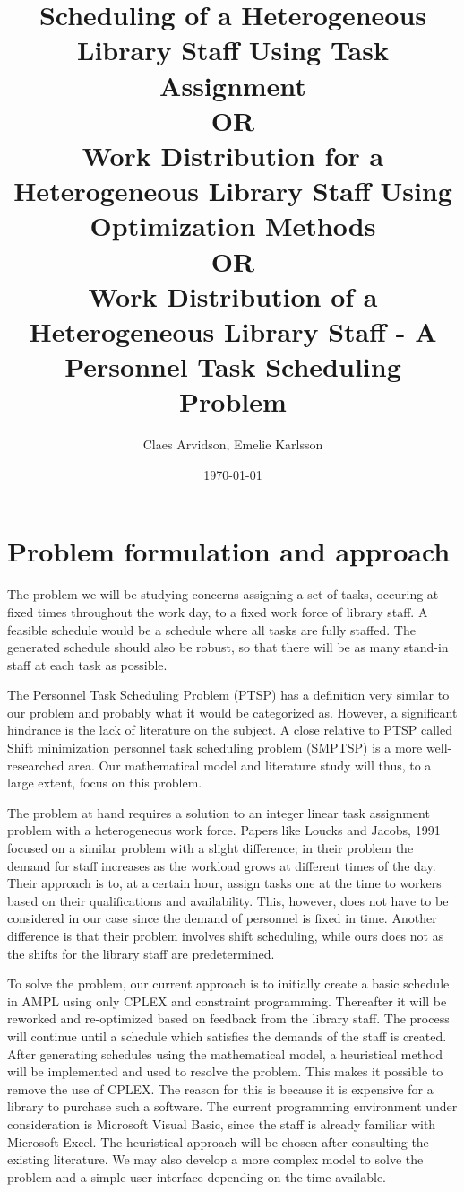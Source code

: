 \documentclass{article}
\title{Scheduling of a Heterogeneous Library Staff Using Task Assignment \\ OR \\
Work Distribution for a Heterogeneous Library Staff Using Optimization Methods \\ OR \\ Work Distribution of a Heterogeneous Library Staff - A Personnel Task Scheduling Problem}
\author{Claes Arvidson, Emelie Karlsson}
\date{\today}
\begin{document}
 
\maketitle
\pagebreak
 
\section*{Problem formulation and approach}
The problem we will be studying concerns assigning a set of tasks, occuring at fixed times throughout the work day, to a fixed work force of library staff. A feasible schedule would be a schedule where all tasks are fully staffed. The generated schedule should also be robust, so that there will be as many stand-in staff at each task as possible.

The Personnel Task Scheduling Problem (PTSP) has a definition very similar to our problem and probably what it would be categorized as. However, a significant hindrance is the lack of literature on the subject. A close relative to PTSP called Shift minimization personnel task scheduling problem (SMPTSP) is a more well-researched area. Our mathematical model and literature study will thus, to a large extent, focus on this problem.

The problem at hand requires a solution to an integer linear task assignment problem with a heterogeneous work force. Papers like Loucks and Jacobs, 1991 focused on a similar problem with a slight difference; in their problem the demand for staff increases as the workload grows at different times of the day. Their approach is to, at a certain hour, assign tasks one at the time to workers based on their qualifications and availability. This, however, does not have to be considered in our case since the demand of personnel is fixed in time. Another difference is that their problem involves shift scheduling, while ours does not as the shifts for the library staff are predetermined.

To solve the problem, our current approach is to initially create a basic schedule in AMPL using only CPLEX and constraint programming. Thereafter it will be reworked and re-optimized based on feedback from the library staff. The process will continue until a schedule which satisfies the demands of the staff is created. After generating schedules using the mathematical model, a heuristical method will be implemented and used to resolve the problem. This makes it possible to remove the use of CPLEX. The reason for this is because it is expensive for a library to purchase such a software. The current programming environment under consideration is Microsoft Visual Basic, since the staff is already familiar with Microsoft Excel. The heuristical approach will be chosen after consulting the existing literature. We may also develop a more complex model to solve the problem and a simple user interface depending on the time available.
\end{document}

